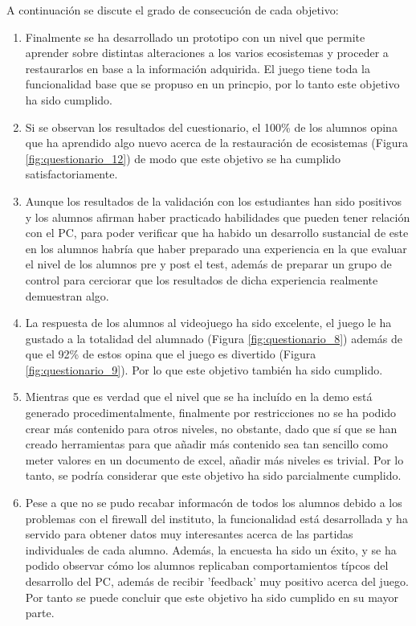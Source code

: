 A continuación se discute el grado de consecución de cada objetivo:
\begin{enumerate}[itemsep=0mm]

\item Finalmente se ha desarrollado un prototipo con un nivel que permite aprender sobre distintas alteraciones a los varios ecosistemas
 y proceder a restaurarlos en base a la información adquirida. El juego tiene toda la funcionalidad base que se propuso en un princpio,
  por lo tanto este objetivo ha sido cumplido.
  
\item Si se observan los resultados del cuestionario, el 100\% de los alumnos opina que ha aprendido algo nuevo acerca de la restauración de ecosistemas
(Figura \ref{fig:questionario_12}) de modo que este objetivo se ha cumplido satisfactoriamente.

\item Aunque los resultados de la validación con los estudiantes han sido positivos y los alumnos afirman haber practicado habilidades que pueden tener relación con el PC, 
para poder verificar que ha habido un desarrollo sustancial de este en los alumnos habría que haber preparado una experiencia en la que evaluar el nivel de los alumnos pre y post el test,
además de preparar un grupo de control para cerciorar que los resultados de dicha experiencia realmente demuestran algo. 

\item La respuesta de los alumnos al videojuego ha sido excelente, el juego le ha gustado a la totalidad del alumnado (Figura \ref{fig:questionario_8}) 
además de que el 92\% de estos opina que el juego es divertido (Figura \ref{fig:questionario_9}). Por lo que este objetivo también ha sido cumplido.

\item Mientras que es verdad que el nivel que se ha incluído en la demo está generado procedimentalmente, finalmente por restricciones no se ha podido
 crear más contenido para otros niveles, no obstante, dado que sí que se han creado herramientas para que añadir más contenido sea tan sencillo como 
 meter valores en un documento de excel, añadir más niveles es trivial. Por lo tanto, se podría considerar que este objetivo ha sido parcialmente cumplido. 

\item Pese a que no se pudo recabar informacón de todos los alumnos debido a los problemas con el firewall del instituto, la funcionalidad está desarrollada y
 ha servido para obtener datos muy interesantes acerca de las partidas individuales de cada alumno. Además, la encuesta ha sido un éxito, y se ha podido
  observar cómo los alumnos replicaban comportamientos típcos del desarrollo del PC, además de recibir 'feedback' muy positivo acerca del juego.
   Por tanto se puede concluir que este objetivo ha sido cumplido en su mayor parte.
\end{enumerate}

